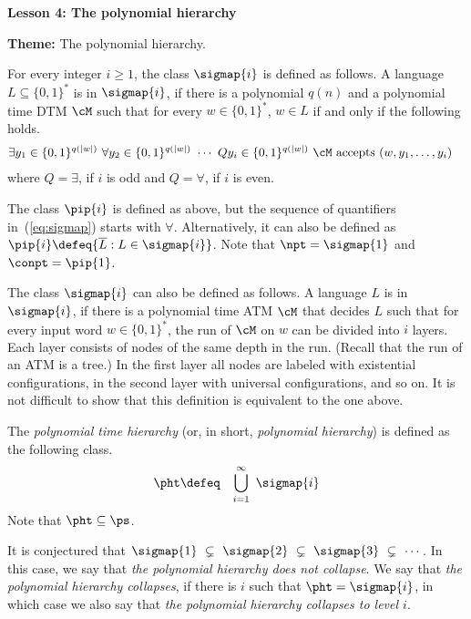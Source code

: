 \documentclass[11pt, a4paper]{article}
\renewcommand{\lesson}{4}
\renewcommand{\lessontitle}{The polynomial hierarchy}
\renewcommand{\fulltitle}{Lesson \lesson: \lessontitle}
\begin{document}
\date{}



\begin{center}
{\Large {\bf \fulltitle}}
\end{center}
\vspace{0.5cm}

\noindent
{\bf Theme:} The polynomial hierarchy.

\vspace{0.5cm}

For every integer $i\geq 1$, the class $\sigmap {i}$ is defined as follows.
A language $L \subseteq \{0,1\}^*$ is in $\sigmap {i}$,
if there is a polynomial $q(n)$ and a polynomial time DTM $\cM$
such that for every $w\in \{0,1\}^*$,
$w\in L$ if and only if the following holds.
\begin{eqnarray}
\label{eq:sigmap}
& 
\exists y_1 \in \{0,1\}^{q(|w|)}\ 
\forall y_2 \in \{0,1\}^{q(|w|)}\
\cdots \
Q y_i \in \{0,1\}^{q(|w|)}\
\cM \ \text{accepts}\ (w,y_1,\ldots,y_i) 
&
\end{eqnarray}
where $Q = \exists$, if $i$ is odd and $Q=\forall$, if $i$ is even.


The class $\pip {i}$ is defined as above, but the sequence of quantifiers in~(\ref{eq:sigmap}) starts with $\forall$.
Alternatively, it can also be defined as
$\pip {i} \defeq \{\overline{L} : L \in \sigmap {i}\}$.
Note that $\npt = \sigmap {1}$ and $\conpt = \pip {1}$.

\begin{remark}
The class $\sigmap {i}$ can also be defined as follows.
A language $L$ is in $\sigmap {i}$, if there is a polynomial time ATM $\cM$ that decides $L$ such that
for every input word $w\in \{0,1\}^*$,
the run of $\cM$ on $w$ can be divided into $i$ layers.
Each layer consists of nodes of the same depth in the run.
(Recall that the run of an ATM is a tree.)
In the first layer all nodes are labeled with existential configurations,
in the second layer with universal configurations, and so on.
It is not difficult to show that this definition is equivalent to the one above.
\end{remark}

The {\em polynomial time hierarchy} (or, in short, {\em polynomial hierarchy}) is defined as the following class.
\begin{eqnarray*}
\pht & \defeq & \bigcup_{i=1}^{\infty} \ \sigmap {i}
\end{eqnarray*}
Note that $\pht \subseteq \ps$.

It is conjectured that 
$\sigmap {1}\ \subsetneq\ \sigmap {2}\ \subsetneq\ \sigmap {3} \ \subsetneq \ \cdots$.
In this case, we say that {\em the polynomial hierarchy does not collapse}.
We say that {\em the polynomial hierarchy collapses},
if there is $i$ such that $\pht = \sigmap {i}$,
in which case we also say that {\em the polynomial hierarchy collapses to level $i$}.
\end{document}
